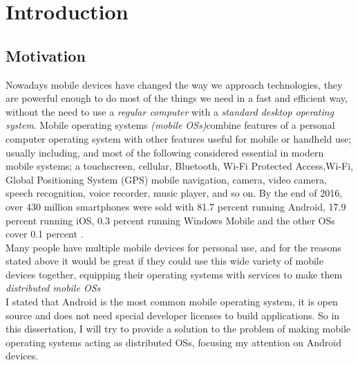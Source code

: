 %
%
\cleardoublepage
%
%
\chapter{Introduction}
%
%
\label{cap:introduction}
%
%

\section{Motivation}\label{motivation}
\par Nowadays mobile devices have changed the way we approach technologies, they are powerful enough to do most of the things we need in a fast and efficient way, without the need to use a \textit{regular computer} with a \textit{standard desktop operating system}. Mobile operating systems \textit{(mobile OSs)}combine features of a personal computer operating system with other features useful for mobile or handheld use; usually including, and most of the following considered essential in modern mobile systems; a touchscreen, cellular, Bluetooth, Wi-Fi Protected Access,Wi-Fi, Global Positioning System (GPS) mobile navigation, camera, video camera, speech recognition, voice recorder, music player, and so on. By the end of 2016, over 430 million smartphones were sold with 81.7 percent running Android, 17.9 percent running iOS, 0.3 percent running Windows Mobile and the other OSs cover 0.1 percent \cite{james2017percent}.\\
Many people have multiple mobile devices for personal use, and for the reasons stated above it would be great if they could use this wide variety of mobile devices together, equipping their operating systems with services to make them \textit{distributed mobile OSs}\\
 I stated that Android is the most common mobile operating system, it is open source and does not need special developer licenses to build applications. So in this dissertation, I will try to provide a solution to the problem of making mobile operating systems acting as distributed OSs, focusing my attention on Android devices. 

